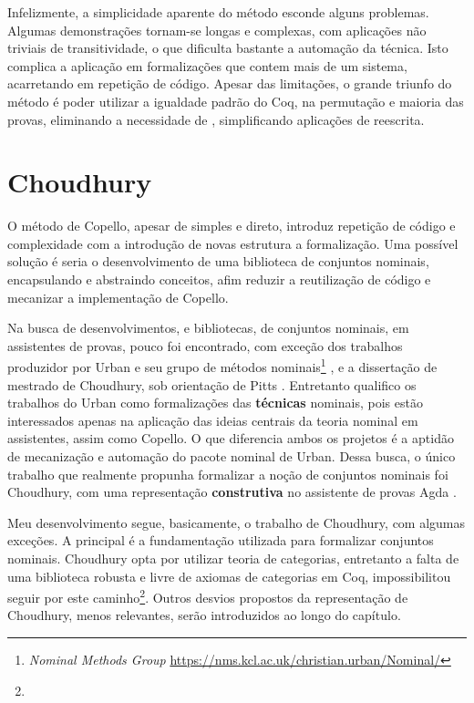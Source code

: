Infelizmente, a simplicidade aparente do método esconde alguns problemas. Algumas demonstrações tornam-se longas e complexas, com aplicações não triviais de transitividade, o que dificulta bastante a automação da técnica. Isto complica a aplicação em formalizações que contem mais de um sistema, acarretando em repetição de código. Apesar das limitações, o grande triunfo do método é poder utilizar a igualdade padrão do Coq, na permutação e maioria das provas, eliminando a necessidade de \setoids, simplificando aplicações de reescrita.

\section{Choudhury}\label{sec:choudhury}
O método de Copello, apesar de simples e direto, introduz repetição de código e complexidade com a introdução de novas estrutura a formalização. Uma possível solução é seria o desenvolvimento de uma biblioteca de conjuntos nominais, encapsulando e abstraindo conceitos, afim reduzir a reutilização de código e mecanizar a implementação de Copello.

Na busca de desenvolvimentos, e bibliotecas, de conjuntos nominais, em assistentes de provas, pouco foi encontrado, com exceção dos trabalhos produzidor por Urban e seu grupo de métodos nominais\footnote{\textit{Nominal Methods Group} \url{https://nms.kcl.ac.uk/christian.urban/Nominal/}} \cite{Urban2008,Urban2005,Urban2006,Huffman2010,Urban2011}, e a dissertação de mestrado de Choudhury, sob orientação de Pitts \cite{Choudhury2015}. Entretanto qualifico os trabalhos do Urban como formalizações das \textbf{técnicas} nominais, pois estão interessados apenas na aplicação das ideias centrais da teoria nominal em assistentes, assim como Copello. O que diferencia ambos os projetos é a aptidão de mecanização e automação do pacote nominal de Urban. Dessa busca, o único trabalho que realmente propunha formalizar a noção de conjuntos nominais foi Choudhury, com uma representação \textbf{construtiva} no assistente de provas Agda \cite{Bove2009}. 


Meu desenvolvimento segue, basicamente, o trabalho de Choudhury, com algumas exceções. A principal é a fundamentação utilizada para formalizar conjuntos nominais. Choudhury opta por utilizar teoria de categorias, entretanto a falta de uma biblioteca robusta e livre de axiomas de categorias em Coq, impossibilitou seguir por este caminho\footnote{}. Outros desvios propostos da representação de Choudhury, menos relevantes, serão introduzidos ao longo do capítulo.

